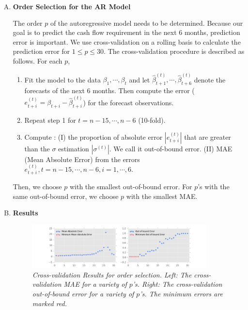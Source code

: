 \begin{enumerate}[A)]
\item\textbf{Order Selection for the AR Model}

    The order $p$ of the autoregressive model needs to be determined. Because our goal is to predict the cash flow requirement in the next 6 months, prediction error is important. We use cross-validation on a rolling basis to calculate the prediction error for $1\leq p\leq 30$. The cross-validation procedure is described as follows.\cite{cvTs} For each $p$, 
    \begin{enumerate}
    	\item Fit the model to the data $\beta_1,\cdots,\beta_t$ and let $\hat{\beta}^{(t)}_{t+1},\cdots,\hat{\beta}^{(t)}_{t+6}$ denote the forecasts of the next 6 months. Then compute the error ($e^{(t)}_{t+i} = \beta_{t+i}- \hat{\beta}^{(t)}_{t+i}$) for the forecast observations. 
        \item Repeat step 1 for $t=n-15,\cdots,n-6$ (10-fold). 
        \item Compute : (I) the proportion of absolute error $|e^{(t)}_{t+i}|$ that are greater than the $\sigma$ estimation $|\sigma^{(t)}|$. We call it out-of-bound error.
        (II) MAE (Mean Absolute Error) from the errors $e^{(t)}_{t+i}, t=n-15,\cdots,n-6,i=1,\cdots,6$. 
    \end{enumerate}
    Then, we choose $p$ with the smallest out-of-bound error. For $p$'s with the same out-of-bound error, we choose $p$ with the smallest MAE.

\item\textbf{Results}

     \begin{figure}
        \centering
        \includegraphics[width=0.9\textwidth]{cv.png}
        \caption{\emph{Cross-validation Results for order selection. Left: The cross-validation MAE for a variety of $p$'s. Right: The cross-validation out-of-bound error for a variety of $p$'s. The minimum errors are marked red.}}
        \label{fig:cv_result}
    \end{figure} 


\end{enumerate}
